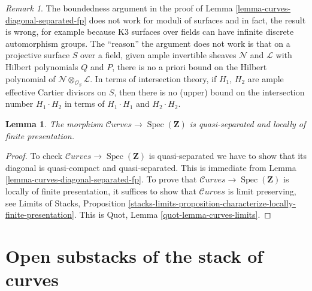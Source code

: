\documentclass{stacks-project}
\theoremstyle{plain}
\newtheorem{lemma}[subsection]{Lemma}
\theoremstyle{definition}
\theoremstyle{remark}
\newtheorem{remark}[subsection]{Remark}
\numberwithin{equation}{subsection}
\def\Spec{\mathop{\mathrm{Spec}}}
\def\Curvesstack{\mathcal{C}\!\mathit{urves}}
\begin{document}
\begin{remark}
\label{remark-boundedness-aut-does-not-work-surfaces}
The boundedness argument in the proof of
Lemma \ref{lemma-curves-diagonal-separated-fp}
does not work for moduli of surfaces and in fact,
the result is wrong, for example because K3 surfaces
over fields can have infinite discrete automorphism groups.
The ``reason'' the argument does not work is that on a
projective surface $S$ over a field,
given ample invertible sheaves $\mathcal{N}$
and $\mathcal{L}$ with Hilbert polynomials $Q$ and $P$,
there is no a priori bound on the Hilbert polynomial
of $\mathcal{N} \otimes_{\mathcal{O}_S} \mathcal{L}$.
In terms of intersection theory, if $H_1$, $H_2$ are ample effective
Cartier divisors on $S$,
then there is no (upper) bound on the intersection number $H_1 \cdot H_2$
in terms of $H_1 \cdot H_1$ and $H_2 \cdot H_2$.
\end{remark}

\begin{lemma}
\label{lemma-curves-qs-lfp}
The morphism $\Curvesstack \to \Spec(\mathbf{Z})$ is quasi-separated and
locally of finite presentation.
\end{lemma}

\begin{proof}
To check $\Curvesstack \to \Spec(\mathbf{Z})$ is quasi-separated we have to
show that its diagonal is quasi-compact and quasi-separated.
This is immediate from Lemma \ref{lemma-curves-diagonal-separated-fp}.
To prove that $\Curvesstack \to \Spec(\mathbf{Z})$ is locally of finite
presentation, it suffices to show that $\Curvesstack$
is limit preserving, see Limits of Stacks, Proposition
\ref{stacks-limits-proposition-characterize-locally-finite-presentation}.
This is Quot, Lemma \ref{quot-lemma-curves-limits}.
\end{proof}






\section{Open substacks of the stack of curves}
\label{section-open}
\end{document}
